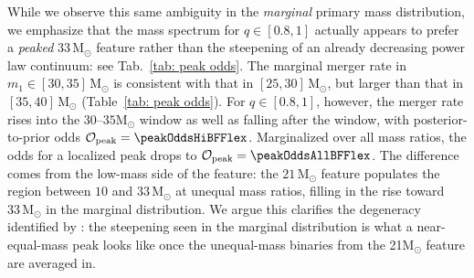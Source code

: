 \documentclass[%
 reprint,
 amsmath,amssymb,
 aps,
 prl,
 nofootinbib,nobibnotes,
]{revtex4-2}
\newcommand{\Msun}{\ensuremath{\mathrm{M}_{\odot}}}
\newcommand{\featTen}{10\xspace}
\newcommand{\featTwenty}{21\xspace}
\newcommand{\featThirtyFive}{33\xspace}
\begin{document}
While we observe this same ambiguity in the \textit{marginal} primary mass distribution, we emphasize that the mass spectrum for $q\in [0.8, 1]$ actually appears to prefer a \textit{peaked} $\featThirtyFive\,\Msun$ feature rather than the steepening of an already decreasing power law continuum: see Tab.~\ref{tab: peak odds}. The marginal merger rate in $m_1 \in [30, 35]\,\Msun$ is consistent with that in $[25, 30]\,\Msun$, but larger than that in $[35, 40]\,\Msun$ (Table~\ref{tab: peak odds}). For $q \in [0.8, 1]$, however, the merger rate rises into the $30$--$35\Msun$ window as well as falling after the window, with posterior-to-prior odds $\mathcal{O}_{\rm peak} = \peakOddsHiBFFlex$. Marginalized over all mass ratios, the odds for a localized peak drops to $\mathcal{O}_{\rm peak} = \peakOddsAllBFFlex$. The difference comes from the low-mass side of the feature: the $\featTwenty\,\Msun$ feature populates the region between $\featTen$ and $\featThirtyFive\,\Msun$ at unequal mass ratios, filling in the rise toward $\featThirtyFive\,\Msun$ in the marginal distribution. We argue this clarifies the degeneracy identified by \citet{LIGOScientific:2025pvj}: the steepening seen in the marginal distribution is what a near-equal-mass peak looks like once the unequal-mass binaries from the \featTwenty $\Msun$ feature are averaged in.
\end{document}
